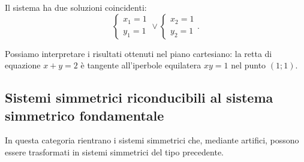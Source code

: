 \begin{exrig}
\begin{esempio}
\begin{multicols}{2}
Il sistema ha due soluzioni coincidenti: \[ \left\{\begin{array}{l}{x_1=1}\\{y_1=1}\end{array}\right.\vee \left\{\begin{array}{l}{x_2=1}\\{y_2=1}\end{array}\right.. \]

Possiamo interpretare i risultati ottenuti nel piano cartesiano: la retta di equazione $x+y=2$ è tangente all'iperbole equilatera $xy=1$ nel punto $(1;1)$.
\begin{center}

\end{center}
\end{multicols}
\end{esempio}
\end{exrig}
\ovalbox{\risolvii \ref{ese:6.14}, \ref{ese:6.15}, \ref{ese:6.16}, \ref{ese:6.17}, \ref{ese:6.18}, \ref{ese:6.19}}

\subsection{Sistemi simmetrici riconducibili al sistema simmetrico fondamentale}
In questa categoria rientrano i sistemi simmetrici che, mediante artifici, possono essere trasformati in sistemi simmetrici del tipo precedente.

